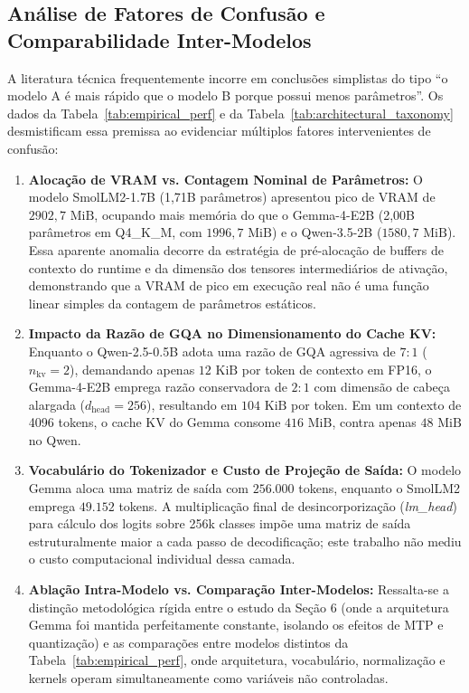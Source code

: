 \documentclass[10pt,a4paper,twocolumn]{article}
\begin{document}
\subsection{An\'alise de Fatores de Confus\~ao e Comparabilidade Inter-Modelos}

A literatura t\'ecnica frequentemente incorre em conclus\~oes simplistas do tipo ``o modelo A \'e mais r\'apido que o modelo B porque possui menos par\^ametros''. Os dados da Tabela~\ref{tab:empirical_perf} e da Tabela~\ref{tab:architectural_taxonomy} desmistificam essa premissa ao evidenciar m\'ultiplos fatores intervenientes de confus\~ao:
\begin{enumerate}[leftmargin=1.5em,itemsep=0.2em]
    \item \textbf{Aloca\c{c}\~ao de VRAM vs. Contagem Nominal de Par\^ametros:} O modelo SmolLM2-1.7B (1,71B par\^ametros) apresentou pico de VRAM de $2902,7\text{ MiB}$, ocupando mais mem\'oria do que o Gemma-4-E2B (2,00B par\^ametros em Q4\_K\_M, com $1996,7\text{ MiB}$) e o Qwen-3.5-2B ($1580,7\text{ MiB}$). Essa aparente anomalia decorre da estrat\'egia de pr\'e-aloca\c{c}\~ao de buffers de contexto do runtime e da dimens\~ao dos tensores intermedi\'arios de ativa\c{c}\~ao, demonstrando que a VRAM de pico em execu\c{c}\~ao real n\~ao \'e uma fun\c{c}\~ao linear simples da contagem de par\^ametros est\'aticos.
    \item \textbf{Impacto da Raz\~ao de GQA no Dimensionamento do Cache KV:} Enquanto o Qwen-2.5-0.5B adota uma raz\~ao de GQA agressiva de $7:1$ ($n_{\text{kv}} = 2$), demandando apenas $12\text{ KiB}$ por token de contexto em FP16, o Gemma-4-E2B emprega raz\~ao conservadora de $2:1$ com dimens\~ao de cabe\c{c}a alargada ($d_{\text{head}} = 256$), resultando em $104\text{ KiB}$ por token. Em um contexto de 4096 tokens, o cache KV do Gemma consome $416\text{ MiB}$, contra apenas $48\text{ MiB}$ no Qwen.
    \item \textbf{Vocabul\'ario do Tokenizador e Custo de Proje\c{c}\~ao de Sa\'ida:} O modelo Gemma aloca uma matriz de sa\'ida com $256.000$ tokens, enquanto o SmolLM2 emprega $49.152$ tokens. A multiplica\c{c}\~ao final de desincorporiza\c{c}\~ao (\emph{lm\_head}) para c\'alculo dos logits sobre 256k classes imp\~oe uma matriz de sa\'ida estruturalmente maior a cada passo de decodifica\c{c}\~ao; este trabalho n\~ao mediu o custo computacional individual dessa camada.
    \item \textbf{Abla\c{c}\~ao Intra-Modelo vs. Compara\c{c}\~ao Inter-Modelos:} Ressalta-se a distin\c{c}\~ao metodol\'ogica r\'igida entre o estudo da Se\c{c}\~ao 6 (onde a arquitetura Gemma foi mantida perfeitamente constante, isolando os efeitos de MTP e quantiza\c{c}\~ao) e as compara\c{c}\~oes entre modelos distintos da Tabela~\ref{tab:empirical_perf}, onde arquitetura, vocabul\'ario, normaliza\c{c}\~ao e kernels operam simultaneamente como vari\'aveis n\~ao controladas.
\end{enumerate}
\end{document}
